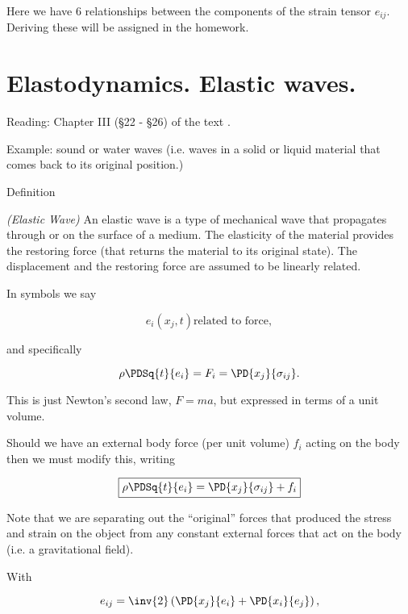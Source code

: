 Here we have 6 relationships between the components of the strain tensor $e_{ij}$.  Deriving these will be assigned in the homework.

\section{Elastodynamics.  Elastic waves.}

Reading: Chapter III (\S 22 - \S 26) of the text \cite{landau1960theory}.

Example: sound or water waves (i.e. waves in a solid or liquid material that comes back to its original position.)

Definition
\begin{definition}
\emph{(Elastic Wave)}
\label{dfn:continuumL6:10}
An elastic wave is a type of mechanical wave that propagates through or on the surface of a medium.  The elasticity of the material provides the restoring force (that returns the material to its original state).  The displacement and the restoring force are assumed to be linearly related.
\end{definition}

In symbols we say

\begin{equation}\label{eqn:continuumL6:130}
e_i(x_j, t) \mbox{related to force},
\end{equation}

and specifically

\begin{equation}\label{eqn:continuumL6:150}
\rho \PDSq{t}{e_i} = F_i = \PD{x_j}{\sigma_{ij}}.
\end{equation}

This is just Newton's second law, $F = ma$, but expressed in terms of a unit volume.

Should we have an external body force (per unit volume) $f_i$ acting on the body then we must modify this, writing

\begin{equation}\label{eqn:continuumL6:170}
\boxed{
\rho \PDSq{t}{e_i} = \PD{x_j}{\sigma_{ij}} + f_i
}
\end{equation}

Note that we are separating out the ``original'' forces that produced the stress and strain on the object from any constant external forces that act on the body (i.e. a gravitational field).

With 

\begin{equation}\label{eqn:continuumL6:190}
e_{ij} = 
\inv{2} \left( 
\PD{x_j}{e_i}
+ \PD{x_i}{e_j} \right),
\end{equation}

